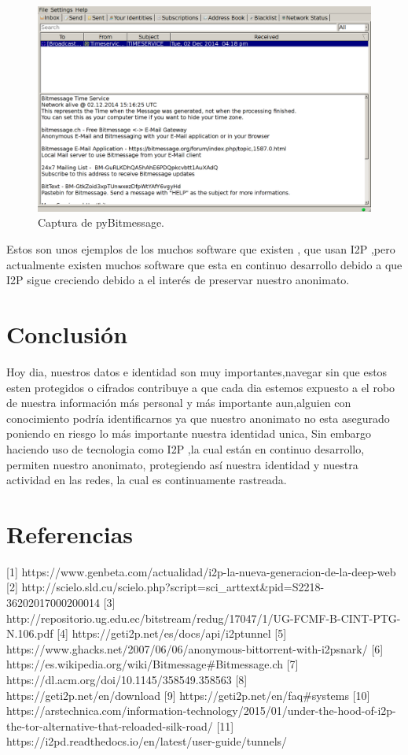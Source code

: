 \documentclass[12]{article}
\begin{document}
\begin{figure}[H]
    \includegraphics[width=1\textwidth]{media/PyBitMessage-client.png}
    \caption{Captura de pyBitmessage.}
    \label{fig6}
\end{figure}

Estos son unos  ejemplos de los muchos software que existen , que usan I2P ,pero actualmente existen muchos software que esta en continuo desarrollo debido a que 
I2P sigue creciendo debido a el interés de preservar nuestro anonimato.

\pagebreak

\section{Conclusión}
Hoy dia, nuestros datos e identidad son muy importantes,navegar sin que estos esten protegidos o cifrados contribuye a que cada dia estemos expuesto
a el robo de  nuestra información más personal y más importante aun,alguien con conocimiento podría identificarnos ya que nuestro anonimato no esta asegurado 
poniendo en riesgo lo más importante nuestra identidad unica, Sin embargo haciendo uso de tecnologia como I2P ,la cual  están en continuo desarrollo,
permiten nuestro anonimato, protegiendo así nuestra identidad y nuestra actividad en las redes, la cual es continuamente rastreada.

\pagebreak

\section{Referencias}

[1] https://www.genbeta.com/actualidad/i2p-la-nueva-generacion-de-la-deep-web 
[2] http://scielo.sld.cu/scielo.php?script=sci\_arttext\&pid=S2218-36202017000200014
[3] http://repositorio.ug.edu.ec/bitstream/redug/17047/1/UG-FCMF-B-CINT-PTG-N.106.pdf
[4] https://geti2p.net/es/docs/api/i2ptunnel 
[5] https://www.ghacks.net/2007/06/06/anonymous-bittorrent-with-i2psnark/ 
[6] https://es.wikipedia.org/wiki/Bitmessage\#Bitmessage.ch 
[7] https://dl.acm.org/doi/10.1145/358549.358563 
[8] https://geti2p.net/en/download 
[9] https://geti2p.net/en/faq\#systems 
[10] https://arstechnica.com/information-technology/2015/01/under-the-hood-of-i2p-the-tor-alternative-that-reloaded-silk-road/ 
[11] https://i2pd.readthedocs.io/en/latest/user-guide/tunnels/ 
\end{document}
